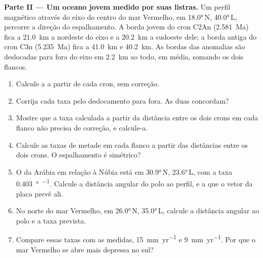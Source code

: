 \begin{problem}
\medskip
\noindent\textbf{Parte II --- Um oceano jovem medido por suas listras.} Um
perfil magnético através do eixo do centro do mar Vermelho, em \ang{18.0}\,N, \ang{40.0}\,L,
percorre a direção do espalhamento. A borda jovem do cron C2An (\qty{2.581}{Ma}) fica a
\qty{21.0}{km} a nordeste do eixo e a \qty{20.2}{km} a sudoeste dele; a borda antiga do cron C3n
(\qty{5.235}{Ma}) fica a \qty{41.0}{km} e \qty{40.2}{km}. As bordas das anomalias são deslocadas para fora do eixo em \qty{2.2}{km} ao todo, em média, somando os dois flancos.
\begin{enumerate}[resume]
  \item Calcule a  a partir de cada cron, sem correção.
  \item Corrija cada taxa pelo deslocamento para fora. As duas concordam?
  \item Mostre que a taxa calculada a partir da distância entre os dois crons em
        cada flanco não precisa de correção, e calcule-a.
  \item Calcule as taxas de metade em cada flanco a partir das distâncias entre os dois
        crons. O espalhamento é simétrico?
  \item O  da Arábia em relação à Núbia está em \ang{30.9}\,N,
        \ang{23.6}\,L, com a taxa \qty{0.403}{\degree\per\Myr}. Calcule a
        distância angular do polo ao perfil, e a  que o vetor da placa prevê ali.
  \item No norte do mar Vermelho, em \ang{26.0}\,N, \ang{35.0}\,L, calcule a
        distância angular ao polo e a taxa prevista.
  \item Compare essas taxas com as medidas, \qty{15}{mm.yr^{-1}} e
        \qty{9}{mm.yr^{-1}}. Por que o mar Vermelho se abre mais depressa no sul?
\end{enumerate}


\end{problem}
